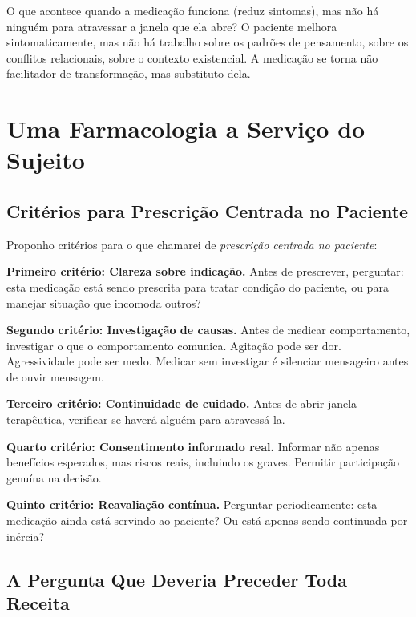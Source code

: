 O que acontece quando a medicação funciona (reduz sintomas), mas não há ninguém para atravessar a janela que ela abre? O paciente melhora sintomaticamente, mas não há trabalho sobre os padrões de pensamento, sobre os conflitos relacionais, sobre o contexto existencial. A medicação se torna não facilitador de transformação, mas substituto dela.

\section{Uma Farmacologia a Serviço do Sujeito}
\label{sec:servico-sujeito}

\subsection{Critérios para Prescrição Centrada no Paciente}

Proponho critérios para o que chamarei de \textit{prescrição centrada no paciente}:

\textbf{Primeiro critério: Clareza sobre indicação.} Antes de prescrever, perguntar: esta medicação está sendo prescrita para tratar condição do paciente, ou para manejar situação que incomoda outros?

\textbf{Segundo critério: Investigação de causas.} Antes de medicar comportamento, investigar o que o comportamento comunica. Agitação pode ser dor. Agressividade pode ser medo. Medicar sem investigar é silenciar mensageiro antes de ouvir mensagem.

\textbf{Terceiro critério: Continuidade de cuidado.} Antes de abrir janela terapêutica, verificar se haverá alguém para atravessá-la.

\textbf{Quarto critério: Consentimento informado real.} Informar não apenas benefícios esperados, mas riscos reais, incluindo os graves. Permitir participação genuína na decisão.

\textbf{Quinto critério: Reavaliação contínua.} Perguntar periodicamente: esta medicação ainda está servindo ao paciente? Ou está apenas sendo continuada por inércia?

\subsection{A Pergunta Que Deveria Preceder Toda Receita}

